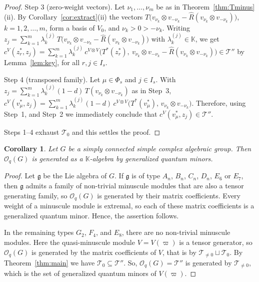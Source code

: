\documentclass[12pt]{amsart}
\theoremstyle{plain}
\newtheorem{corollary}[theorem]{Corollary}
\theoremstyle{remark}
\newcommand{\g}{\mathfrak{g}}
\newcommand{\wt}{\operatorname{wt}}
\newcommand{\ot}{\otimes}
\newcommand{\vp}{\varpi}
\newcommand{\Rhat}{\widehat{R}}
\newcommand{\Phis}{\Phi_{s}}
\newcommand{\K}{\mathbb{K}}
\begin{document}
\begin{proof}
Step 3 (zero-weight vectors). Let $\nu_1,\dots,\nu_m$ be as in
Theorem~\ref{thm:Tminus}\,(ii). By Corollary~\ref{cor:extract}(ii) the vectors
$T\big(v_{\nu_k}\ot v_{-\nu_k}-\Rhat(v_{\nu_k}\ot v_{-\nu_k})\big)$,
$k=1,2,\dots,m$, form a basis of $V_0$, and $\nu_k>0>-\nu_k$. Writing
$z_j=\sum_{k=1}^{m}\lambda^{(j)}_k\,
T\big(v_{\nu_k}\ot v_{-\nu_k}-\Rhat(v_{\nu_k}\ot v_{-\nu_k})\big)$ with
$\lambda^{(j)}_k\in\K$, we get 
$c^V(z_r^*,z_j)=\sum_{k=1}^{m}\lambda^{(j)}_k\,
c^{V\ot V}\big(T^*(z_r^*),\ v_{\nu_k}\ot v_{-\nu_k}
-\Rhat(v_{\nu_k}\ot v_{-\nu_k})\big)\in\mathscr{T}''$
by Lemma~\ref{lem:key}, for all $r,j\in I_s$.

Step 4 (transposed family). Let $\mu\in\Phis$ and $j\in I_s$. With
$z_j=\sum_{k=1}^{m}\lambda^{(j)}_k(1-d)\,T(v_{\nu_k}\ot v_{-\nu_k})$ as in Step~3, $c^V(v_\mu^*,z_j)=\sum_{k=1}^{m}\lambda^{(j)}_k(1-d)\,
c^{V\ot V}\big(T^*(v_\mu^*),\,v_{\nu_k}\ot v_{-\nu_k}\big).$ Therefore, using Step~1, and Step~2 we immediately conclude that $c^V(v_\mu^*,z_j)\in\mathscr{T}''$. 


Steps 1--4 exhaust $\mathscr{T}_0$ and this settles the proof.
\end{proof}

\begin{corollary}\label{cor:allG}
Let $G$ be a simply connected simple complex algebraic group. Then $\mathcal{O}_q(G)$
is generated as a $\K$-algebra by generalized quantum minors.
\end{corollary}

\begin{proof}
Let $\g$ be the Lie algebra of $G$. If $\g$ is of type $A_n$, $B_n$, $C_n$, $D_n$,
$E_6$ or $E_7$, then $\g$ admits a family of non-trivial
minuscule modules that are also a tensor generating family, so $\mathcal{O}_q(G)$ is generated
by their matrix coefficients. Every weight of a minuscule module is extremal, so each of these matrix coefficients is a generalized quantum minor. Hence, the assertion follows.

In the remaining types $G_2$, $F_4$, and $E_8$, there are no non-trivial minuscule modules. Here
the quasi-minuscule module $V=V(\vp)$ is a tensor generator, so $\mathcal{O}_q(G)$ is
generated by the matrix coefficients of $V$, that is by
$\mathscr{T}_{\neq0}\sqcup\mathscr{T}_0$. By Theorem~\ref{thm:main} we have
$\mathscr{T}_0\subseteq\mathscr{T}''$. So, $\mathcal{O}_q(G)=\mathscr{T}''$ is
generated by $\mathscr{T}_{\neq0}$, which is the set of generalized
quantum minors of $V(\vp)$.
\end{proof}
\end{document}
